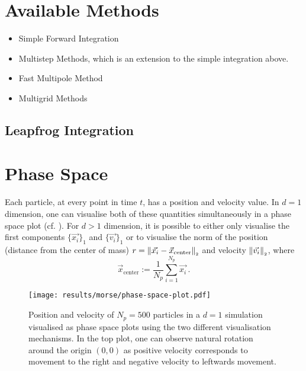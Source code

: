 \section{Available Methods}
\begin{itemize}
  \item Simple Forward Integration
  \item Multistep Methods, which is an extension to the simple integration above.
  \item Fast Multipole Method
  \item Multigrid Methods
\end{itemize}
\hierKoennteIhreWerbungStehen

\subsection{Leapfrog Integration}

\hierKoennteIhreWerbungStehen


\section{Phase Space}
Each particle, at every point in time $t$, has a position and velocity value.
In $d=1$ dimension, one can visualise both of these quantities simultaneously in a phase space plot (cf. ).
For $d > 1$ dimension, it is possible to either only visualise the first components $\{\vec{x_i}\}_1$ and $\{\vec{v_i}\}_1$ or to visualise the norm of the position (distance from the center of mass) $r = \left\lVert\vec{x_i} - \vec{x}_{\text{center}}\right\rVert_{\scriptscriptstyle 2}$ and velocity $\left\lVert\vec{v_i}\right\rVert_{\scriptscriptstyle 2}$, where $$\vec{x}_{\text{center}} := \frac{1}{N_p} \sum_{i=1}^{N_p} \vec{x_i}\,.$$

\begin{figure}[H]
  \centering
  \label{fig:phase-space-plot}
  \texttt{[image: results/morse/phase-space-plot.pdf]}
  \caption[Phase Space Plots]{Position and velocity of $N_p = 500$ particles in a $d=1$ simulation visualised as phase space plots using the two different visualisation mechanisms. In the top plot, one can observe natural rotation around the origin $(0, 0)$ as positive velocity corresponds to movement to the right and negative velocity to leftwards movement.}
\end{figure}

